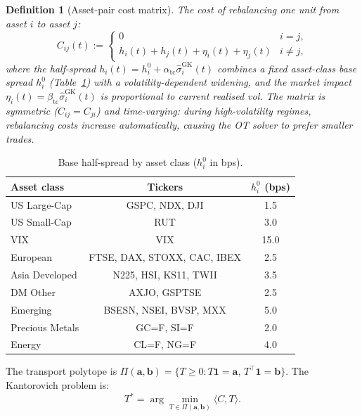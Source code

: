 \documentclass[10pt,twocolumn]{article}
\newtheorem{definition}{Definition}
\begin{document}
\begin{definition}[Asset-pair cost matrix]
The cost of rebalancing one unit from asset $i$ to asset $j$:
\begin{equation}\label{eq:cost_new}
C_{ij}(t) := \begin{cases}0 & i=j,\\
  h_i(t) + h_j(t) + \eta_i(t) + \eta_j(t) & i\neq j,\end{cases}
\end{equation}
where the half-spread $h_i(t) = h_i^0 + \alpha_{\mathrm{tc}}\hat\sigma_i^{\mathrm{GK}}(t)$
combines a fixed asset-class base spread $h_i^0$ (Table~\ref{tab:tc_classes})
with a volatility-dependent widening, and the market impact
$\eta_i(t) = \beta_{\mathrm{tc}}\hat\sigma_i^{\mathrm{GK}}(t)$ is proportional
to current realised vol.  The matrix is symmetric ($C_{ij}=C_{ji}$) and
\emph{time-varying}: during high-volatility regimes, rebalancing costs increase
automatically, causing the OT solver to prefer smaller trades.
\end{definition}

\begin{table}[!htbp]
\centering
\caption{Base half-spread by asset class ($h_i^0$ in bps).}
\label{tab:tc_classes}
\small
\begin{tabular}{@{}lcc@{}}
\toprule
\textbf{Asset class} & \textbf{Tickers} & \textbf{$h_i^0$ (bps)} \\
\midrule
US Large-Cap  & GSPC, NDX, DJI      & 1.5 \\
US Small-Cap  & RUT                  & 3.0 \\
VIX           & VIX                  & 15.0 \\
European      & FTSE, DAX, STOXX, CAC, IBEX & 2.5 \\
Asia Developed & N225, HSI, KS11, TWII & 3.5 \\
DM Other      & AXJO, GSPTSE         & 2.5 \\
Emerging      & BSESN, NSEI, BVSP, MXX & 5.0 \\
Precious Metals & GC=F, SI=F         & 2.0 \\
Energy        & CL=F, NG=F           & 4.0 \\
\bottomrule
\end{tabular}
\end{table}

The transport polytope is
$\Pi(\bm{a},\bm{b})=\{T\ge 0:T\bm{1}=\bm{a},\,T^\top\bm{1}=\bm{b}\}$.
The Kantorovich problem is:
\begin{equation}\label{eq:kant}
T^* = \arg\min_{T\in\Pi(\bm{a},\bm{b})}
  \langle C,T\rangle.
\end{equation}
\end{document}
